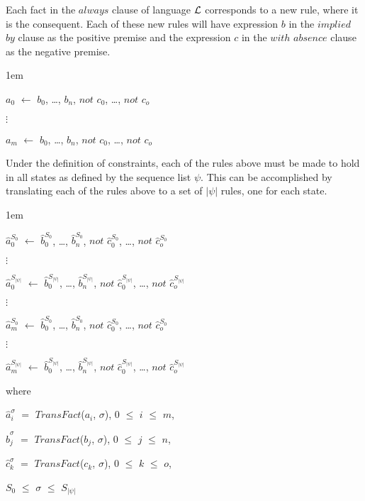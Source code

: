\documentclass[11pt, twocolumn]{article}
\newenvironment{vquote}
  {\begin{list}{}{\leftmargin 1em}\item[]}
  {\end{list}}
\begin{document}
          Each fact in the $always$ clause of language ${\cal L}$ corresponds
          to a new rule, where it is the consequent. Each of these new rules
          will have expression $b$ in the $implied$ $by$ clause as the positive
          premise and the expression $c$ in the $with$ $absence$ clause as the
          negative premise.

          \begin{vquote}
            $a_{0}$ $\leftarrow$
            $b_{0}$, \ldots, $b_{n}$,
            $not$ $c_{0}$, \ldots, $not$ $c_{o}$

            $\vdots$

            $a_{m}$ $\leftarrow$
            $b_{0}$, \ldots, $b_{n}$,
            $not$ $c_{0}$, \ldots, $not$ $c_{o}$
          \end{vquote}

          Under the definition of constraints, each of the rules above must be
          made to hold in all states as defined by the sequence list $\psi$.
          This can be accomplished by translating each of the rules above to
          a set of $|\psi|$ rules, one for each state.

           \begin{vquote}
            $\hat{a}^{S_{0}}_{0}$ $\leftarrow$
            $\hat{b}^{S_{0}}_{0}$, \ldots, $\hat{b}^{S_{0}}_{n}$,
            $not$ $\hat{c}^{S_{0}}_{0}$, \ldots, $not$ $\hat{c}^{S_{0}}_{o}$

            $\vdots$

            $\hat{a}^{S_{|\psi|}}_{0}$ $\leftarrow$
            $\hat{b}^{S_{|\psi|}}_{0}$, \ldots, $\hat{b}^{S_{|\psi|}}_{n}$,
            $not$ $\hat{c}^{S_{|\psi|}}_{0}$, \ldots, $not$ $\hat{c}^{S_{|\psi|}}_{o}$

            $\vdots$

            $\hat{a}^{S_{0}}_{m}$ $\leftarrow$
            $\hat{b}^{S_{0}}_{0}$, \ldots, $\hat{b}^{S_{0}}_{n}$,
            $not$ $\hat{c}^{S_{0}}_{0}$, \ldots, $not$ $\hat{c}^{S_{0}}_{o}$

            $\vdots$

            $\hat{a}^{S_{|\psi|}}_{m}$ $\leftarrow$
            $\hat{b}^{S_{|\psi|}}_{0}$, \ldots, $\hat{b}^{S_{|\psi|}}_{n}$,
            $not$ $\hat{c}^{S_{|\psi|}}_{0}$, \ldots, $not$ $\hat{c}^{S_{|\psi|}}_{o}$

            where

            $\hat{a}^{\sigma}_{i}$ $=$ $TransFact$($a_{i}$, $\sigma$),
            $0$ $\leq$ $i$ $\leq$ $m$,

            $\hat{b}^{\sigma}_{j}$ $=$ $TransFact$($b_{j}$, $\sigma$),
            $0$ $\leq$ $j$ $\leq$ $n$,

            $\hat{c}^{\sigma}_{k}$ $=$ $TransFact$($c_{k}$, $\sigma$),
            $0$ $\leq$ $k$ $\leq$ $o$,

            $S_{0}$ $\leq$ $\sigma$ $\leq$ $S_{|\psi|}$
          \end{vquote}
\end{document}
